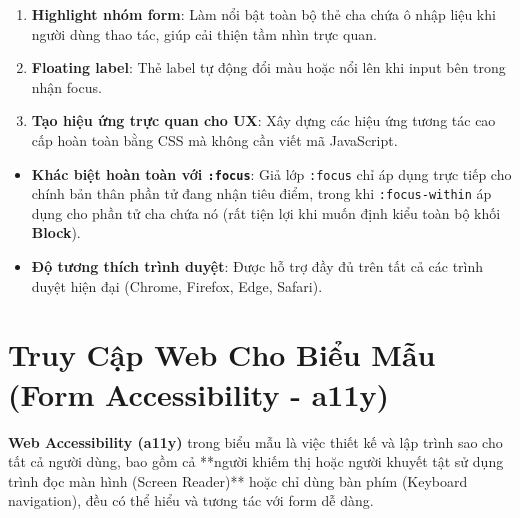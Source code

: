 \documentclass[11pt,oneside]{book}
\newcommand{\codeinline}[1]{\textcolor{accentOrange}{\texttt{#1}}}
\newcommand{\term}[1]{\textbf{\textcolor{primaryBlue}{#1}}}
\begin{document}
\begin{tipBox}
\begin{enumerate}[leftmargin=1.5em, itemsep=4pt, parsep=0pt]
    \item \textbf{Highlight nhóm form}: Làm nổi bật toàn bộ thẻ cha chứa ô nhập liệu khi người dùng thao tác, giúp cải thiện tầm nhìn trực quan.
    \item \textbf{Floating label}: Thẻ label tự động đổi màu hoặc nổi lên khi input bên trong nhận focus.
    \item \textbf{Tạo hiệu ứng trực quan cho UX}: Xây dựng các hiệu ứng tương tác cao cấp hoàn toàn bằng CSS mà không cần viết mã JavaScript.
\end{enumerate}
\end{tipBox}

\begin{warnBox}
\begin{itemize}[leftmargin=1.5em, itemsep=4pt, parsep=0pt]
    \item \textbf{Khác biệt hoàn toàn với \codeinline{:focus}}: Giả lớp \codeinline{:focus} chỉ áp dụng trực tiếp cho chính bản thân phần tử đang nhận tiêu điểm, trong khi \codeinline{:focus-within} áp dụng cho phần tử cha chứa nó (rất tiện lợi khi muốn định kiểu toàn bộ khối \term{Block}).
    \item \textbf{Độ tương thích trình duyệt}: Được hỗ trợ đầy đủ trên tất cả các trình duyệt hiện đại (Chrome, Firefox, Edge, Safari).
\end{itemize}
\end{warnBox}


\section{Truy Cập Web Cho Biểu Mẫu (Form Accessibility - a11y)}
\label{sec:form_accessibility}

\begin{conceptBox}
\term{Web Accessibility (a11y)} trong biểu mẫu là việc thiết kế và lập trình sao cho tất cả người dùng, bao gồm cả **người khiếm thị hoặc người khuyết tật sử dụng trình đọc màn hình (Screen Reader)** hoặc chỉ dùng bàn phím (Keyboard navigation), đều có thể hiểu và tương tác với form dễ dàng.
\end{conceptBox}
\end{document}
